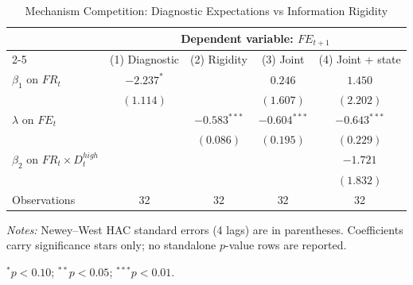 \begin{table}[htbp]
\centering
\begin{threeparttable}
\caption{Mechanism Competition: Diagnostic Expectations vs Information Rigidity}
\label{tab:mechanism_horse_race}
{\small
\begin{tabular}{lcccc}
\toprule
 & \multicolumn{4}{c}{Dependent variable: $FE_{t+1}$} \\
\cmidrule(lr){2-5}
 & (1) Diagnostic & (2) Rigidity & (3) Joint & (4) Joint + state \\
\midrule
$\beta_1$ on $FR_t$ & $-2.237^{*}$ &  & $0.246$ & $1.450$ \\
 & $(1.114)$ &  & $(1.607)$ & $(2.202)$ \\
\addlinespace
$\lambda$ on $FE_t$ &  & $-0.583^{***}$ & $-0.604^{***}$ & $-0.643^{***}$ \\
 &  & $(0.086)$ & $(0.195)$ & $(0.229)$ \\
\addlinespace
$\beta_2$ on $FR_t \times D_t^{high}$ &  &  &  & $-1.721$ \\
 &  &  &  & $(1.832)$ \\
\addlinespace
Observations & 32 & 32 & 32 & 32 \\
\bottomrule
\end{tabular}
}
\begin{tablenotes}[flushleft]
\footnotesize
\item \textit{Notes:} Newey--West HAC standard errors (4 lags) are in parentheses. Coefficients carry significance stars only; no standalone $p$-value rows are reported.
\item $^{*}p<0.10$; $^{**}p<0.05$; $^{***}p<0.01$.
\end{tablenotes}
\end{threeparttable}
\end{table}
